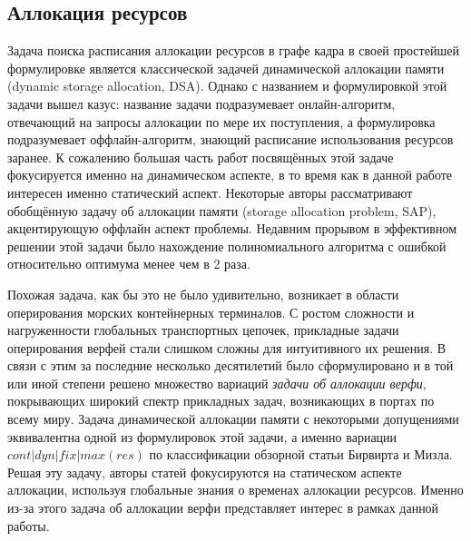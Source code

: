 \subsection{Аллокация ресурсов}
Задача поиска расписания аллокации ресурсов в графе кадра в своей простейшей формулировке является классической задачей динамической аллокации памяти (dynamic storage allocation, DSA\cite[стр. 226]{10.5555/574848}). Однако с названием и формулировкой этой задачи вышел казус: название задачи подразумевает онлайн-алгоритм, отвечающий на запросы аллокации по мере их поступления, а формулировка подразумевает оффлайн-алгоритм, знающий расписание использования ресурсов заранее. К сожалению большая часть работ посвящённых этой задаче фокусируется именно на динамическом аспекте, в то время как в данной работе интересен именно статический аспект. Некоторые авторы рассматривают обобщённую задачу об аллокации памяти (storage allocation problem, SAP), акцентирующую оффлайн аспект проблемы. Недавним прорывом в эффективном решении этой задачи было нахождение полиномиального алгоритма с ошибкой относительно оптимума менее чем в 2 раза\cite{https://doi.org/10.48550/arxiv.1911.10871}.

Похожая задача, как бы это не было удивительно, возникает в области оперирования морских контейнерных терминалов. С ростом сложности и нагруженности глобальных транспортных цепочек, прикладные задачи оперирования верфей стали слишком сложны для интуитивного их решения. В связи с этим за последние несколько десятилетий было сформулировано и в той или иной степени решено множество вариаций \textit{задачи об аллокации верфи}, покрывающих широкий спектр прикладных задач, возникающих в портах по всему миру. Задача динамической аллокации памяти с некоторыми допущениями эквивалентна одной из формулировок этой задачи, а именно вариации $cont|dyn|fix|max(res)$ по классификации обзорной статьи Бирвирта и Мизла\cite{BIERWIRTH2010615}. Решая эту задачу, авторы статей фокусируются на статическом аспекте аллокации, используя глобальные знания о временах аллокации ресурсов. Именно из-за этого задача об аллокации верфи представляет интерес в рамках данной работы.

